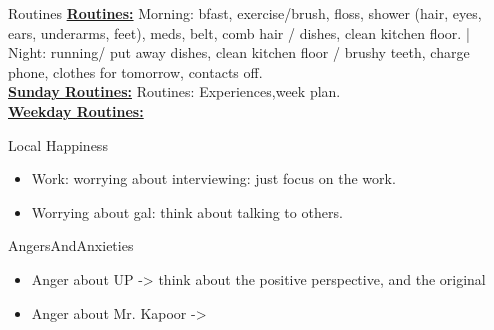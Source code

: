 \documentclass[serif, mathserif, final]{beamer}
\begin{document}
\begin{frame}
  \begin{columns}
    \begin{column}{0.25\linewidth} %
      \begin{block}{Routines}
      { \tiny\underline{ \bf Routines:} Morning: bfast, exercise/brush,
      floss, shower (hair, eyes, ears, underarms, feet), meds, belt,
      comb hair / dishes, clean kitchen floor. |  Night: running/ put
      away dishes, clean kitchen floor / brushy teeth, charge phone,
      clothes for tomorrow, contacts off.} \\ 
      {\tiny \underline{\bf Sunday Routines:} Routines: Experiences,week plan.} \\ 
      {\tiny \underline{\bf Weekday Routines:}}  
      \end{block} 
      \begin{block}{Local Happiness}
        \begin{itemize} 
          \tiny \item \tiny Work: worrying about interviewing: just focus on the work. 
        \item \tiny Worrying about gal: think about talking to others. 
        \end{itemize}
      \end{block} 
      \begin{block}{AngersAndAnxieties}
        \begin{itemize}
          \tiny \item \tiny Anger about UP -> think about the positive
            perspective, and the original
          \item \tiny Anger about Mr. Kapoor ->  

\end{itemize}
\end{block}
\end{column}
\end{columns}
\end{frame}
\end{document}
